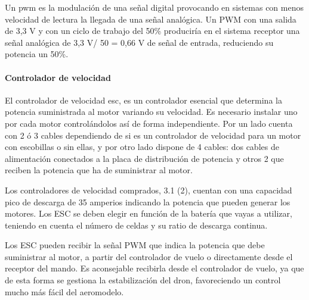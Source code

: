  
 Un \acl{pwm} es la modulación de una señal digital provocando en sistemas con menos velocidad de lectura la llegada de una señal analógica. Un PWM con una salida de 3,3 V y con un ciclo de trabajo del 50\% produciría en el sistema receptor una señal analógica de 3,3 V/ 50 = 0,66 V de señal de entrada, reduciendo su potencia un 50\%.

 
 \paragraph{Controlador de velocidad}
 \label{SSS:Controlador de velocidad}
 


 El controlador de velocidad \acl{esc}, es un controlador esencial que determina la potencia suministrada al motor variando su velocidad. Es necesario instalar uno por cada motor controlándolos así de forma independiente.
 Por un lado cuenta con 2 ó 3 cables dependiendo de si es un controlador de velocidad para un motor con escobillas o sin ellas, y por otro lado dispone de 4 cables: dos cables de alimentación conectados a la placa de distribución de potencia y otros 2 que reciben la potencia que ha de suministrar al motor.
 
 
 Los controladores de velocidad comprados, 3.1 (2), cuentan con una capacidad pico de descarga de 35 amperios indicando la potencia que pueden generar los motores. Los ESC se deben elegir en función de la batería que vayas a utilizar, teniendo en cuenta el número de celdas y su ratio de descarga continua.
 
 Los ESC pueden recibir la señal PWM que indica la potencia que debe suministrar al motor, a partir del controlador de vuelo o directamente desde el receptor del mando. Es aconsejable recibirla desde el controlador de vuelo, ya que de esta forma se gestiona la estabilización del dron, favoreciendo un control mucho más fácil del aeromodelo. \cite{OscarSerrano}

